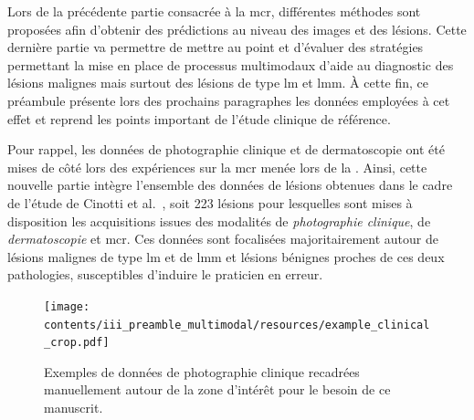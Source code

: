\renewcommand{\thechapter}{\roman{chapter}}
\setcounter{chapter}{4}
\setcounter{figure}{0}

\label{chap:preamble_multimodal}
Lors de la précédente partie consacrée à la \acrlong{mcr}, différentes méthodes sont proposées afin d'obtenir des prédictions au niveau des images et des lésions. Cette dernière partie va permettre de mettre au point et d'évaluer des stratégies permettant la mise en place de processus multimodaux d'aide au diagnostic des lésions malignes mais surtout des lésions de type \gls{lm} et \gls{lmm}. À cette fin, ce préambule présente lors des prochains paragraphes les données employées à cet effet et reprend les points important de l'étude clinique de référence.\par

Pour rappel, les données de photographie clinique et de dermatoscopie ont été mises de côté lors des expériences sur la \gls{mcr} menée lors de la . Ainsi, cette nouvelle partie intègre l'ensemble des données de lésions obtenues dans le cadre de l'étude de Cinotti et al.~\cite{Cinotti2018}, soit 223 lésions pour lesquelles sont mises à disposition les acquisitions issues des modalités de \textit{photographie clinique}, de \textit{dermatoscopie} et \gls{mcr}. Ces données sont focalisées majoritairement autour de lésions malignes de type \gls{lm} et de \gls{lmm} et lésions bénignes proches de ces deux pathologies, susceptibles d'induire le praticien en erreur.\par 

\begin{figure}[H]
    \begin{center}
        \texttt{[image: contents/iii\_preamble\_multimodal/resources/example\_clinical\_crop.pdf]}
        \caption{Exemples de données de photographie clinique recadrées manuellement autour de la zone d'intérêt pour le besoin de ce manuscrit.}
        \label{fig:example_clinical_crop}
    \end{center} 
\end{figure}\par
\clearpage

